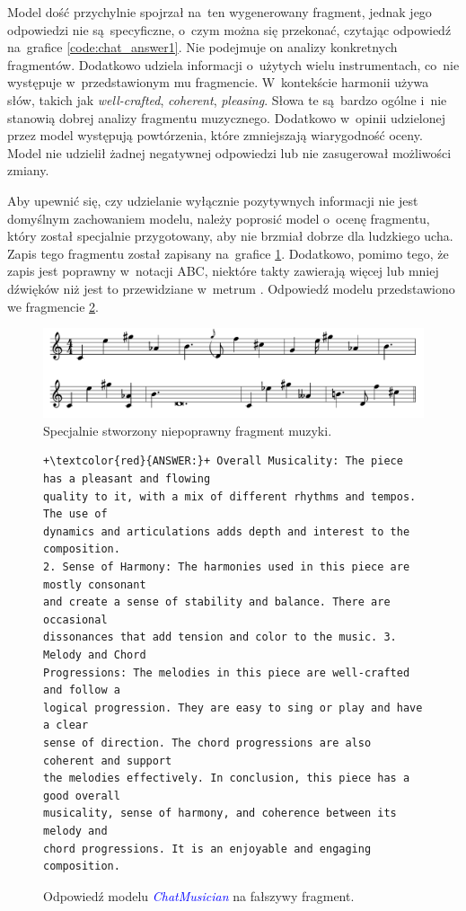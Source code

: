 \documentclass[data-science]{agh-wi} %
\begin{document}
Model dość przychylnie spojrzał na~ten wygenerowany fragment, jednak jego odpowiedzi nie są~specyficzne, o~czym można się przekonać, czytając odpowiedź na~grafice \ref*{code:chat_answer1}. Nie podejmuje on analizy konkretnych fragmentów. Dodatkowo udziela informacji o~użytych wielu instrumentach, co~nie występuje w~przedstawionym mu fragmencie. W~kontekście harmonii używa słów, takich jak \textit{well-crafted}, \textit{coherent}, \textit{pleasing}. Słowa te są~bardzo ogólne i~nie stanowią dobrej analizy fragmentu muzycznego. Dodatkowo w~opinii udzielonej przez model występują powtórzenia, które zmniejszają wiarygodność oceny. Model nie udzielił żadnej negatywnej odpowiedzi lub nie zasugerował możliwości zmiany.

Aby upewnić się, czy udzielanie wyłącznie pozytywnych informacji nie jest domyślnym zachowaniem modelu, należy poprosić model o~ocenę fragmentu, który został specjalnie przygotowany, aby nie brzmiał dobrze dla ludzkiego ucha. Zapis tego fragmentu został zapisany na~grafice \ref*{fig:gen_bad}. Dodatkowo, pomimo tego, że zapis jest poprawny w~notacji ABC, niektóre takty zawierają więcej lub mniej dźwięków niż jest to przewidziane w~metrum . Odpowiedź modelu przedstawiono we fragmencie \ref*{code:chat_prompt2}.

\begin{figure}[ht!]
    \begin{center}
        \includegraphics[width=0.9\linewidth]{./img/abc_gen_notnice1.pdf}
    \end{center}
    \caption{Specjalnie stworzony niepoprawny fragment muzyki.}\label{fig:gen_bad}
\end{figure}

\begin{figure}[ht!]
    \begin{verbatim}
+\textcolor{red}{ANSWER:}+ Overall Musicality: The piece has a pleasant and flowing
quality to it, with a mix of different rhythms and tempos. The use of 
dynamics and articulations adds depth and interest to the composition. 
2. Sense of Harmony: The harmonies used in this piece are mostly consonant 
and create a sense of stability and balance. There are occasional 
dissonances that add tension and color to the music. 3. Melody and Chord 
Progressions: The melodies in this piece are well-crafted and follow a 
logical progression. They are easy to sing or play and have a clear 
sense of direction. The chord progressions are also coherent and support 
the melodies effectively. In conclusion, this piece has a good overall 
musicality, sense of harmony, and coherence between its melody and 
chord progressions. It is an enjoyable and engaging composition.
    \end{verbatim}
    \caption{Odpowiedź modelu \textcolor{blue}{\textit{ChatMusician}} na fałszywy fragment.}\label{code:chat_prompt2}
\end{figure}
\end{document}
